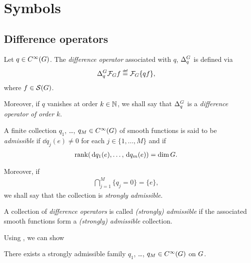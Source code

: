 \chapter{Symbols}
\label{chapter:symbols}

\section{Difference operators}

\begin{definition}
\label{definition:difference_operators}
    Let $q \in {C^\infty(G)}$.
    The \emph{difference operator} associated with $q$, ${\Delta^{G}_{q}}$ is defined via
    \begin{align*}
        \DifferenceOperator{q} \Fourier f \defeq \Fourier\{q f\},
    \end{align*}
    where $f \in {\mathcal{S} (G)}$.

    Moreover, if $q$ vanishes at order $k \in \mathbb{N}$,
    we shall say that ${\Delta^{G}_{q}}$ is a \emph{difference operator of order $k$}.
\end{definition}

\begin{definition}
\label{definition:admissibility_of_difference_operators}
    A finite collection $q_1$, \dots, $q_M \in {C^\infty(G)}$ of smooth functions is said to be \emph{admissible}
    if $\dd q_j(e) \neq 0$ for each $j \in \{1, \dots, M\}$
    and if
    \begin{align*}
        \operatorname{rank}(\,\mathrm{d} q_1(e), \dots, \,\mathrm{d} q_m(e)) = \dim G.
    \end{align*}

    Moreover, if
    \begin{align*}
        \bigcap_{j = 1}^M \{ q_j = 0 \} = \{e\},
    \end{align*}
    we shall say that the collection is \emph{strongly admissible}.

    A collection of \emph{difference operators} is called \emph{(strongly) admissible}
    if the associated smooth functions form a \emph{(strongly) admissible} collection.
\end{definition}

Using \cite[Lemma 4.4]{RuzhanskyTurunenWirth10}, we can show

\begin{lemma}
    There exists a strongly admissible family $q_1$, \dots, $q_M \in {C^\infty(G)}$ on $G$.
\end{lemma}

